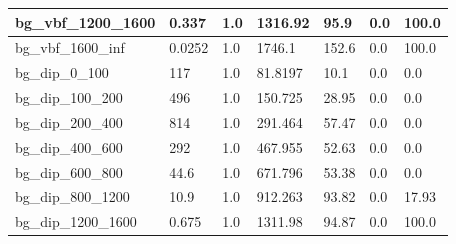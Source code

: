 \documentclass[a4paper, 10pt]{article}
\begin{document}
\begin{table}[H]
\begin{center}
\begin{tabular}{|m{23.0mm}|m{23.0mm}|m{18.0mm}|m{19.0mm}|m{19.0mm}|m{19.0mm}|m{19.0mm}|}
      \hline
      {\cellcolor{white}         bg\_vbf\_1200\_1600}& {\cellcolor{white}         0.337}& {\cellcolor{white}         1.0}& {\cellcolor{white}         1316.92}& {\cellcolor{white}         95.9}& {\cellcolor{red}         0.0}& {\cellcolor{red}         100.0}\\
      \hline
      {\cellcolor{white}         bg\_vbf\_1600\_inf}& {\cellcolor{white}         0.0252}& {\cellcolor{white}         1.0}& {\cellcolor{white}         1746.1}& {\cellcolor{white}         152.6}& {\cellcolor{red}         0.0}& {\cellcolor{red}         100.0}\\
      \hline
      {\cellcolor{white}         bg\_dip\_0\_100}& {\cellcolor{white}         117}& {\cellcolor{white}         1.0}& {\cellcolor{white}         81.8197}& {\cellcolor{white}         10.1}& {\cellcolor{green}         0.0}& {\cellcolor{green}         0.0}\\
      \hline
      {\cellcolor{white}         bg\_dip\_100\_200}& {\cellcolor{white}         496}& {\cellcolor{white}         1.0}& {\cellcolor{white}         150.725}& {\cellcolor{white}         28.95}& {\cellcolor{green}         0.0}& {\cellcolor{green}         0.0}\\
      \hline
      {\cellcolor{white}         bg\_dip\_200\_400}& {\cellcolor{white}         814}& {\cellcolor{white}         1.0}& {\cellcolor{white}         291.464}& {\cellcolor{white}         57.47}& {\cellcolor{green}         0.0}& {\cellcolor{green}         0.0}\\
      \hline
      {\cellcolor{white}         bg\_dip\_400\_600}& {\cellcolor{white}         292}& {\cellcolor{white}         1.0}& {\cellcolor{white}         467.955}& {\cellcolor{white}         52.63}& {\cellcolor{green}         0.0}& {\cellcolor{green}         0.0}\\
      \hline
      {\cellcolor{white}         bg\_dip\_600\_800}& {\cellcolor{white}         44.6}& {\cellcolor{white}         1.0}& {\cellcolor{white}         671.796}& {\cellcolor{white}         53.38}& {\cellcolor{green}         0.0}& {\cellcolor{green}         0.0}\\
      \hline
      {\cellcolor{white}         bg\_dip\_800\_1200}& {\cellcolor{white}         10.9}& {\cellcolor{white}         1.0}& {\cellcolor{white}         912.263}& {\cellcolor{white}         93.82}& {\cellcolor{red}         0.0}& {\cellcolor{red}         17.93}\\
      \hline
      {\cellcolor{white}         bg\_dip\_1200\_1600}& {\cellcolor{white}         0.675}& {\cellcolor{white}         1.0}& {\cellcolor{white}         1311.98}& {\cellcolor{white}         94.87}& {\cellcolor{red}         0.0}& {\cellcolor{red}         100.0}\\

\end{tabular}
\end{center}
\end{table}
\end{document}
